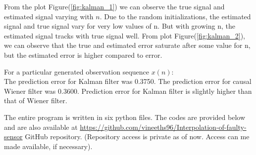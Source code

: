 \documentclass[a4 paper]{article}
\begin{document}
From the plot Figure(\ref{fig:kalman_1}) we can observe the true signal and estimated signal varying with $n$. Due to the random initializations, the estimated signal and true signal vary for very low values of n. But with growing n, the estimated signal tracks with true signal well. From plot Figure(\ref{fig:kalman_2}), we can observe that the true and estimated error saturate after some value for n, but the estimated error is higher compared to error.

\vspace{10em}

For a particular generated observation sequence $x(n)$: \\
The prediction error for Kalman filter was 0.3750. The prediction error for causal Wiener filter was 0.3600. Prediction error for Kalman filter is slightly higher than that of Wiener filter.




\newpage
{}
\solution The entire program is written in six python files. The codes are provided below and are also available at \url{https://github.com/vineeths96/Interpolation-of-faulty-sensor} GitHub repository. (Repository access is private as of now. Access can me made available, if necessary).

\inputminted[frame=lines, framesep=2mm, baselinestretch=1.2, fontsize=\footnotesize, linenos]{python3}{../wiener_interpolator.py}

\inputminted[frame=lines, framesep=2mm, baselinestretch=1.2, fontsize=\footnotesize, linenos]{python3}{../kalman_filter.py}


\inputminted[frame=lines, framesep=2mm, baselinestretch=1.2, fontsize=\footnotesize, linenos]{python3}{../wiener_plots.py}

\inputminted[frame=lines, framesep=2mm, baselinestretch=1.2, fontsize=\footnotesize, linenos]{python3}{../kalman_plots.py}

\inputminted[frame=lines, framesep=2mm, baselinestretch=1.2, fontsize=\footnotesize, linenos]{python3}{../comparison.py}

\inputminted[frame=lines, framesep=2mm, baselinestretch=1.2, fontsize=\footnotesize, linenos]{python3}{../parameters.py}
\end{document}
